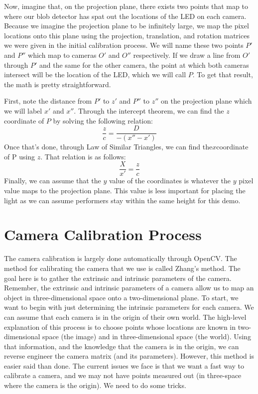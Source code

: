 \documentclass[
    12pt,
    twoside,
    bibstyle=chicago,
    headerstyle=uppercase,
	bibfile=thesis.bib
]{reedthesis}
\begin{document}
Now, imagine that, on the projection plane, there exists two points that map to where our blob detector has spat out the locations of the LED on each camera. Because we imagine the projection plane to be infinitely large, we map the pixel locations onto this plane using the projection, translation, and rotation matrices we were given in the initial calibration process. We will name these two points $P'$ and $P''$ which map to cameras $O'$ and $O''$ respectively. If we draw a line from $O'$ through $P'$ and the same for the other camera, the point at which both cameras intersect will be the location of the LED, which we will call $P$. To get that result, the math is pretty straightforward.

First, note the distance from $P'$ to $z'$ and $P''$ to $z''$ on the projection plane which we will label $x'$ and $x''$. Through the intercept theorem, we can find the $z$ coordinate of $P$ by solving the following relation:
\[\frac{z}{c} = \frac{D}{-(x'' - x')}\]
Once that's done, through Law of Similar Triangles, we can find the$x$coordinate of P using $z$. That relation is as follows:
\[\frac{X}{x'}=\frac{z}{c}\]
Finally, we can assume that the $y$ value of the coordinates is whatever the $y$ pixel value maps to the projection plane. This value is less important for placing the light as we can assume performers stay within the same height for this demo.

\section{Camera Calibration Process}
The camera calibration is largely done automatically through OpenCV. The method for calibrating the camera that we use is called Zhang's method. The goal here is to gather the extrinsic and intrinsic parameters of the camera. Remember, the extrinsic and intrinsic parameters of a camera allow us to map an object in three-dimensional space onto a two-dimensional plane. To start, we want to begin with just determining the intrinsic parameters for each camera. We can assume that each camera is in the origin of their own world. The high-level explanation of this process is to choose points whose locations are known in two-dimensional space (the image) and in three-dimensional space (the world). Using that information, and the knowledge that the camera is in the origin, we can reverse engineer the camera matrix (and its parameters). However, this method is easier said than done. The current issues we face is that we want a fast way to calibrate a camera, and we may not have points measured out (in three-space where the camera is the origin). We need to do some tricks.
\end{document}
